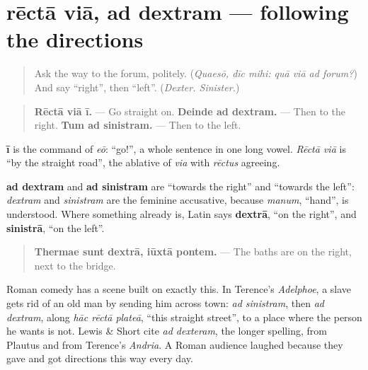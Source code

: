 \section[rēctā viā, ad dextram, ad sinistram]{rēctā viā, ad dextram — following the directions}

\label{lesson:LA-C285-recta-via}



\begin{quote}
Ask the way to the forum, politely. (\emph{Quaesō, dīc mihi: quā viā ad forum?}) And say \textquotedblleft{}right\textquotedblright{}, then \textquotedblleft{}left\textquotedblright{}. (\emph{Dexter. Sinister.})
\end{quote}

\begin{grammarlens}[title={Grammar Lens: three directions}]
\begin{quote}
\textbf{Rēctā viā ī.} — Go straight on. \textbf{Deinde ad dextram.} — Then to the right. \textbf{Tum ad sinistram.} — Then to the left.
\end{quote}

\textbf{ī} is the command of \emph{eō}: \textquotedblleft{}go!\textquotedblright{}, a whole sentence in one long vowel. \emph{Rēctā viā} is \textquotedblleft{}by the straight road\textquotedblright{}, the ablative of \emph{via} with \emph{rēctus} agreeing.

\textbf{ad dextram} and \textbf{ad sinistram} are \textquotedblleft{}towards the right\textquotedblright{} and \textquotedblleft{}towards the left\textquotedblright{}: \emph{dextram} and \emph{sinistram} are the feminine accusative, because \emph{manum}, \textquotedblleft{}hand\textquotedblright{}, is understood. Where something already is, Latin says \textbf{dextrā}, \textquotedblleft{}on the right\textquotedblright{}, and \textbf{sinistrā}, \textquotedblleft{}on the left\textquotedblright{}.

\begin{quote}
\textbf{Thermae sunt dextrā, iūxtā pontem.} — The baths are on the right, next to the bridge.
\end{quote}
\end{grammarlens}

\begin{culture}
Roman comedy has a scene built on exactly this. In Terence's \emph{Adelphoe}, a slave gets rid of an old man by sending him across town: \emph{ad sinistram}, then \emph{ad dextram}, along \emph{hāc rēctā plateā}, \textquotedblleft{}this straight street\textquotedblright{}, to a place where the person he wants is not. Lewis \& Short cite \emph{ad dexteram}, the longer spelling, from Plautus and from Terence's \emph{Andria}. A Roman audience laughed because they gave and got directions this way every day.
\end{culture}

